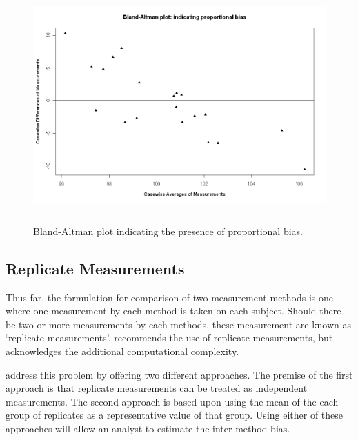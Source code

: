 \documentclass[12pt, a4paper]{report}
\theoremstyle{plain}
\theoremstyle{definition}
\theoremstyle{remark}
\begin{document}
	\begin{figure}[h!]
		\begin{center}
			\includegraphics[height=90mm]{images/PropBias.jpeg}
			\caption{Bland-Altman plot indicating the presence of proportional bias.}\label{PropBias}
		\end{center}
	\end{figure}
	
	
	
	
	
	
	\subsection{Replicate Measurements}
	
	Thus far, the formulation for comparison of two measurement methods is one where one measurement by each method is taken on	each subject. Should there be two or more measurements by each methods, these measurement are known as `replicate measurements'.
	\citet{BXC2008} recommends the use of replicate measurements, but acknowledges the additional computational complexity.
	
	\citet*{BA86} address this problem by offering two different approaches. The premise of the first approach is that replicate
	measurements can be treated as independent measurements. The second approach is based upon using the mean of the each group of
	replicates as a representative value of that group. Using either
	of these approaches will allow an analyst to estimate the inter
	method bias.
	
	
\end{document}
